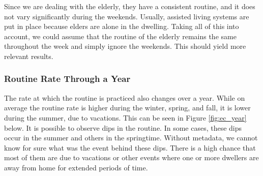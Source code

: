 Since we are dealing with the elderly, they have a consistent routine, and it does not vary significantly during the weekends.
Usually, assisted living systems are put in place because elders are alone in the dwelling.
Taking all of this into account, we could assume that the routine of the elderly remains the same throughout the week and simply ignore the weekends.
This should yield more relevant results.

\subsubsection{Routine Rate Through a Year}

The rate at which the routine is practiced also changes over a year.
While on average the routine rate is higher during the winter, spring, and fall, it is lower during the summer, due to vacations.
This can be seen in Figure \ref{fig:ec_year} below.
It is possible to observe dips in the routine.
In some cases, these dips occur in the summer and others in the springtime.
Without metadata, we cannot know for sure what was the event behind these dips.
There is a high chance that most of them are due to vacations or other events where one or more dwellers are away from home for extended periods of time.

